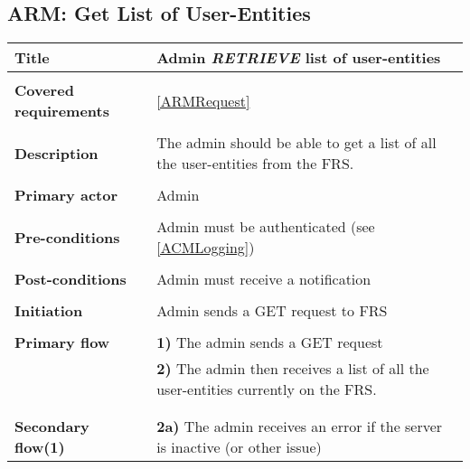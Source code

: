 \documentclass[a4paper,11pt]{article}
\begin{document}
\subsection{ARM: Get List of User-Entities}

\begin{tabular}{|p{3.5cm}|p{11.5cm}|} \hline
    \textbf{Title} &   Admin \emph{RETRIEVE} list of user-entities

    \\ \hline \rowcolor{Gray} & \\ \hline

    \textbf{Covered requirements} &  \ref{ARMRequest}

    \\ \hline \rowcolor{Gray} & \\ \hline

    \textbf{Description} &  The admin should be able to get a list of all the user-entities from the FRS.

    \\ \hline \rowcolor{Gray} & \\ \hline

    \textbf{Primary actor} & Admin

    \\ \hline \rowcolor{Gray} & \\ \hline

    \textbf{Pre-conditions} &   Admin must be authenticated (see \ref{ACMLogging})

    \\ \hline \rowcolor{Gray} & \\ \hline

    \textbf{Post-conditions} &   Admin must receive a notification

    \\ \hline \rowcolor{Gray} & \\ \hline

    \textbf{Initiation} & Admin sends a GET request to FRS

    \\ \hline \rowcolor{Gray} & \\ \hline

    \textbf{Primary flow} &
    \textbf{1)} The admin sends a GET request \\&
    \textbf{2)} The admin then receives a list of all the user-entities currently on the FRS. \\&

    \\ \hline \rowcolor{Gray} & \\ \hline

    \textbf{Secondary flow(1)} &
    \textbf{2a)} The admin receives an error if the server is inactive (or other issue)

    \\ \hline
\end{tabular}
\end{document}

